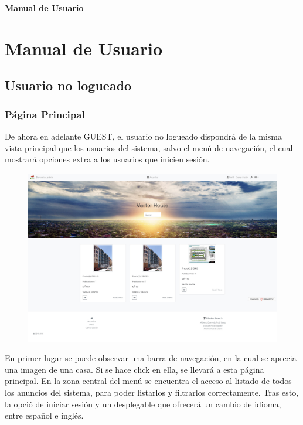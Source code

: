 \newpage{\pagestyle{empty}\cleardoublepage}
\newpage
\vspace*{\fill}
    \begin{center}
      \thispagestyle{empty} \vspace*{0cm} \textbf{\huge
Manual de Usuario}
    \end{center}
    \vspace*{\fill}
\newpage{\pagestyle{empty}\cleardoublepage}
\chapter{Manual de Usuario}
\section{Usuario no logueado}
\subsection{P\'{a}gina Principal}
De ahora en adelante GUEST, el usuario no logueado dispondr\'{a} de la misma vista principal que los usuarios del sistema, salvo el men\'{u} de navegaci\'{o}n, el cual mostrar\'{a} opciones extra a los usuarios que inicien sesi\'{o}n.\\

\begin{figure}[h!]
\centering
\includegraphics[width=.7\textwidth]{Img/ManualUsuario/PPAL_GUEST.jpg}
\end{figure}

En primer lugar se puede observar una barra de navegaci\'{o}n, en la cual se aprecia una imagen de una casa. Si se hace click en ella, se llevar\'{a} a esta p\'{a}gina principal. En la zona central del men\'{u} se encuentra el acceso al listado de todos los anuncios del sistema, para poder listarlos y filtrarlos correctamente. Tras esto, la opci\'{o} de iniciar sesi\'{o}n y un desplegable que ofrecer\'{a} un cambio de idioma, entre espa\~{n}ol e ingl\'{e}s.

